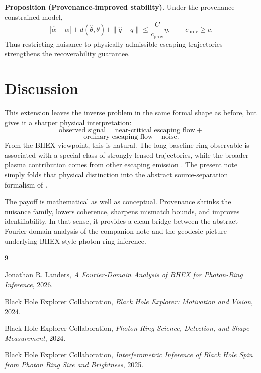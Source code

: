 \documentclass[10pt,letterpaper,twocolumn]{article}
\begin{document}
\par\smallskip\noindent\textbf{Proposition (Provenance-improved stability).} Under the provenance-constrained model,
\[
|\hat\alpha-\alpha| + d(\hat\theta,\theta) + \|\hat q-q\|
\le
\frac{C}{c_{\mathrm{prov}}}\eta,
\qquad c_{\mathrm{prov}}\ge c.
\]
Thus restricting nuisance to physically admissible escaping trajectories strengthens the recoverability guarantee.

\section{Discussion}

This extension leaves the inverse problem in the same formal shape as before, but gives it a sharper physical interpretation:
\[
\text{observed signal} = \text{near-critical escaping flow} + 
\]
\[
\text{ordinary escaping flow} + \text{noise}.
\]
From the BHEX viewpoint, this is natural. The long-baseline ring observable is associated with a special class of strongly lensed trajectories, while the broader plasma contribution comes from other escaping emission \cite{BHEXVision,BHEXDetection,BHEXSpin}. The present note simply folds that physical distinction into the abstract source-separation formalism of \cite{LandersFourierBHEX}.

The payoff is mathematical as well as conceptual. Provenance shrinks the nuisance family, lowers coherence, sharpens mismatch bounds, and improves identifiability. In that sense, it provides a clean bridge between the abstract Fourier-domain analysis of the companion note and the geodesic picture underlying BHEX-style photon-ring inference.

\begin{thebibliography}{9}

Jonathan R. Landers,
\emph{A Fourier-Domain Analysis of BHEX for Photon-Ring Inference}, 2026.

Black Hole Explorer Collaboration,
\emph{Black Hole Explorer: Motivation and Vision}, 2024.

Black Hole Explorer Collaboration,
\emph{Photon Ring Science, Detection, and Shape Measurement}, 2024.

Black Hole Explorer Collaboration,
\emph{Interferometric Inference of Black Hole Spin from Photon Ring Size and Brightness}, 2025.

\end{thebibliography}
\end{document}
